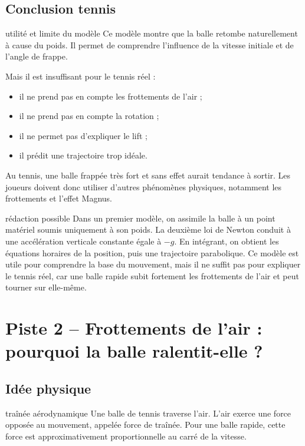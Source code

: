 \documentclass[11pt,a4paper]{article}
\begin{document}
\subsection{Conclusion tennis}

\begin{tennis}{utilité et limite du modèle}
Ce modèle montre que la balle retombe naturellement à cause du poids. Il permet de comprendre l'influence de la vitesse initiale et de l'angle de frappe.

Mais il est insuffisant pour le tennis réel :
\begin{itemize}
    \item il ne prend pas en compte les frottements de l'air ;
    \item il ne prend pas en compte la rotation ;
    \item il ne permet pas d'expliquer le lift ;
    \item il prédit une trajectoire trop idéale.
\end{itemize}

Au tennis, une balle frappée très fort et sans effet aurait tendance à sortir. Les joueurs doivent donc utiliser d'autres phénomènes physiques, notamment les frottements et l'effet Magnus.
\end{tennis}

\begin{oral}{rédaction possible}
Dans un premier modèle, on assimile la balle à un point matériel soumis uniquement à son poids. La deuxième loi de Newton conduit à une accélération verticale constante égale à $-g$. En intégrant, on obtient les équations horaires de la position, puis une trajectoire parabolique. Ce modèle est utile pour comprendre la base du mouvement, mais il ne suffit pas pour expliquer le tennis réel, car une balle rapide subit fortement les frottements de l'air et peut tourner sur elle-même.
\end{oral}

\section{Piste 2 -- Frottements de l'air : pourquoi la balle ralentit-elle ?}

\subsection{Idée physique}

\begin{idee}{traînée aérodynamique}
Une balle de tennis traverse l'air. L'air exerce une force opposée au mouvement, appelée force de traînée. Pour une balle rapide, cette force est approximativement proportionnelle au carré de la vitesse.
\end{idee}
\end{document}
